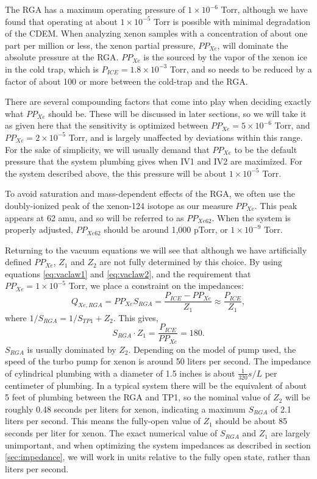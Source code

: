 \documentclass[12pt]{article}
\begin{document}
The RGA has a maximum operating pressure of $1\times 10^{-6}$ Torr, although we have found that operating at about $1\times 10^{-5}$ Torr is possible with minimal degradation of the CDEM. When analyzing xenon samples with a concentration of about one part per million or less, the xenon partial pressure, $PP_{Xe}$,  will dominate the absolute pressure at the RGA. $PP_{Xe}$ is the sourced by the vapor of the xenon ice in the cold trap, which is $P_{ICE}=1.8\times 10^{-3}$ Torr, and so needs to be reduced by a factor of about 100 or more between the cold-trap and the RGA\cite{vaporpressure}. 

There are several compounding factors that come into play when deciding exactly what $PP_{Xe}$ should be. These will be discussed in later sections, so we will take it as given here that the sensitivity is optimized between $PP_{Xe}=5\times10^{-6}$ Torr, and $PP_{Xe}=2\times10^{-5}$ Torr, and is largely unaffected by deviations within this range. For the sake of simplicity, we will usually demand that $PP_{Xe}$ to be the default pressure that the system plumbing gives when IV1 and IV2 are maximized. For the system described above, the this pressure will be about $1\times 10^{-5}$ Torr. 

To avoid saturation and mass-dependent effects of the RGA, we often use the doubly-ionized peak of the xenon-124 isotope as our measure $PP_{Xe}$. This peak appears at 62 amu, and so will be referred to as $PP_{Xe62}$. When the system is properly adjusted, $PP_{Xe62}$ should be around 1,000 pTorr, or $1\times 10^{-9}$ Torr.

Returning to the vacuum equations we will see that although we have artificially defined $PP_{Xe}$, $Z_1$ and $Z_2$ are not fully determined by this choice. By using equations \ref{eq:vaclaw1} and \ref{eq:vaclaw2}, and the requirement that $PP_{Xe}=1\times 10^{-5}$ Torr, we place a constraint on the impedances:
\begin{equation}
\label{eq:xepres1}
Q_{Xe,RGA}=PP_{Xe}S_{RGA}=\frac{P_{ICE}-PP_{Xe}}{Z_1}\approx \frac{P_{ICE}}{Z_1},
\end{equation}
where $1/S_{RGA}=1/S_{TP1}+Z_2$. This gives,
\begin{equation}
\label{eq:impconstraint}
S_{RGA}\cdot Z_1= \frac{P_{ICE}}{PP_{Xe}} = 180.
\end{equation}
$S_{RGA}$ is usually dominated by $Z_2$. Depending on the model of pump used, the speed of the turbo pump for xenon is around 50 liters per second. The impedance of cylindrical plumbing with a diameter of 1.5 inches is about $\frac{1}{320} s/L$ per centimeter of plumbing.\cite{vac_eq} In a typical system there will be the equivalent of about 5 feet of plumbing between the RGA and TP1, so the nominal value of $Z_2$ will be roughly 0.48 seconds per liters for xenon, indicating a maximum $S_{RGA}$ of 2.1 liters per second.\cite{vac_eq} This means the fully-open value of $Z_1$ should be about 85 seconds per liter for xenon. The exact numerical value of $S_{RGA}$ and $Z_1$ are largely unimportant, and when optimizing the system impedances as described in section \ref{sec:impedance}, we will work in units relative to the fully open state, rather than liters per second.
\end{document}

